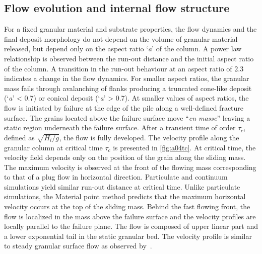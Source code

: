 \subsection{Flow evolution and internal flow structure}
For a fixed granular material and substrate properties, the flow dynamics and 
the final deposit morphology do not depend on the volume of granular material 
released, but depend only on the aspect ratio `\textit{a}' of the column. A 
power law relationship is observed between the run-out distance and the initial 
aspect ratio of the column. A transition in the run-out behaviour at an aspect 
ratio of 2.3 indicates a change in the flow dynamics. For smaller aspect 
ratios, the granular mass fails through avalanching of flanks producing a 
truncated cone-like deposit (`\textit{a}' < 0.7) or conical deposit 
(`\textit{a}' > 0.7). At smaller values of aspect ratios, the flow is initiated 
by failure at the edge of the pile along a well-defined fracture surface. The 
grains located above the failure surface move ``\textit{en masse}'' leaving a 
static region underneath the failure surface. After a transient time of order 
$\tau_{c}$, defined as $\sqrt{H_{\textit{i}}/g}$, the flow is fully developed. 
The velocity profile along the granular column at critical time $\tau_{c}$ is 
presented in \cref{fig:a04tc}. At critical time, the velocity field 
depends only on the position of the grain along the sliding mass. The maximum 
velocity is observed at the front of the flowing mass corresponding to that of 
a plug flow in horizontal direction. Particulate and continuum simulations 
yield similar run-out distance at critical time. Unlike particulate 
simulations, the Material point method predicts that the maximum horizontal 
velocity occurs at the top of the sliding mass. Behind the fast flowing front, 
the flow is localized in the mass above the failure surface and the velocity 
profiles are locally parallel to the failure plane. The flow is composed of 
upper linear part and a lower exponential tail in the static granular bed. The 
velocity profile is similar to steady granular surface flow as observed 
by~\citet{Lajeunesse2004}. 

